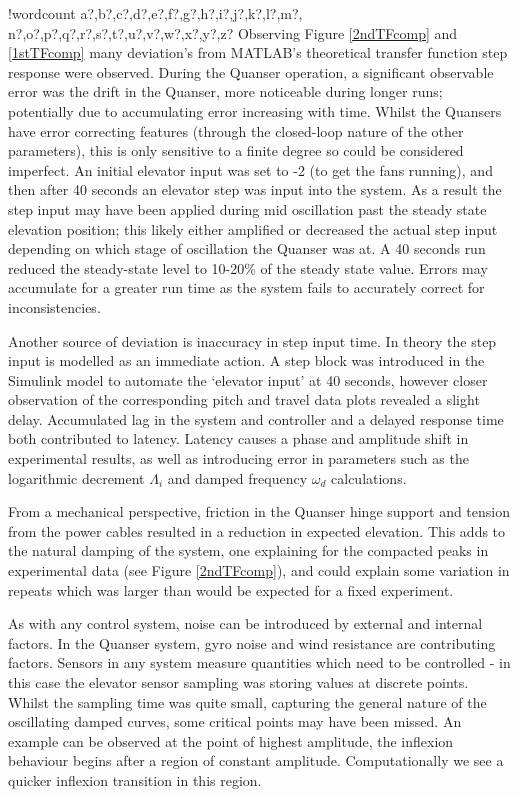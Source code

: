 \documentclass[11pt]{article}
\newcounter{words}
\newenvironment{counted}{%
  \setcounter{words}{0}
  \SearchList!{wordcount}{\stepcounter{words}}
    {a?,b?,c?,d?,e?,f?,g?,h?,i?,j?,k?,l?,m?,
    n?,o?,p?,q?,r?,s?,t?,u?,v?,w?,x?,y?,z?}
  \UndoBoundary{'}
  \SearchOrder{p;}}{%
  \StopSearching}
\begin{document}
\begin{counted}
Observing Figure \ref{2ndTFcomp} and \ref{1stTFcomp} many deviation's
from MATLAB's theoretical transfer function step response were observed.
During the Quanser operation, a significant observable error was the
drift in the Quanser, more noticeable during longer runs; potentially
due to accumulating error increasing with time. Whilst the Quansers have
error correcting features (through the closed-loop nature of the other
parameters), this is only sensitive to a finite degree so could be
considered imperfect. An initial elevator input was set to -2 (to get
the fans running), and then after 40 seconds an elevator step was input
into the system. As a result the step input may have been applied during
mid oscillation past the steady state elevation position; this likely
either amplified or decreased the actual step input depending on which
stage of oscillation the Quanser was at. A 40 seconds run reduced the
steady-state level to 10-20\% of the steady state value. Errors may
accumulate for a greater run time as the system fails to accurately
correct for inconsistencies.

Another source of deviation is inaccuracy in step input time. In theory
the step input is modelled as an immediate action. A step block was
introduced in the Simulink model to automate the `elevator input' at 40
seconds, however closer observation of the corresponding pitch and
travel data plots revealed a slight delay. Accumulated lag in the system
and controller and a delayed response time both contributed to latency.
Latency causes a phase and amplitude shift in experimental results, as
well as introducing error in parameters such as the logarithmic
decrement \(\Lambda_i\) and damped frequency \(\omega_d\) calculations.

From a mechanical perspective, friction in the Quanser hinge support and
tension from the power cables resulted in a reduction in expected
elevation. This adds to the natural damping of the system, one
explaining for the compacted peaks in experimental data (see Figure
\ref{2ndTFcomp}), and could explain some variation in repeats which was
larger than would be expected for a fixed experiment.

As with any control system, noise can be introduced by external and
internal factors. In the Quanser system, gyro noise and wind resistance
are contributing factors. Sensors in any system measure quantities which
need to be controlled - in this case the elevator sensor sampling was
storing values at discrete points. Whilst the sampling time was quite
small, capturing the general nature of the oscillating damped curves,
some critical points may have been missed. An example can be observed at
the point of highest amplitude, the inflexion behaviour begins after a
region of constant amplitude. Computationally we see a quicker inflexion
transition in this region.

\newpage

\end{counted} %
\end{document}
